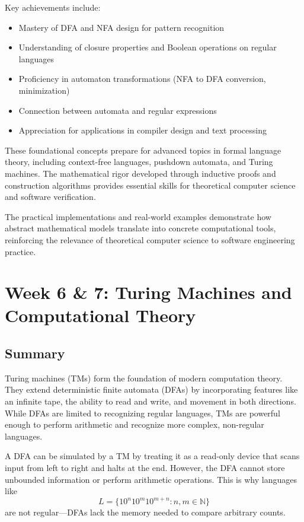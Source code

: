 \documentclass{article}
\begin{document}
Key achievements include:
\begin{itemize}
    \item Mastery of DFA and NFA design for pattern recognition
    \item Understanding of closure properties and Boolean operations on regular languages
    \item Proficiency in automaton transformations (NFA to DFA conversion, minimization)
    \item Connection between automata and regular expressions
    \item Appreciation for applications in compiler design and text processing
\end{itemize}

These foundational concepts prepare for advanced topics in formal language theory, including context-free languages, pushdown automata, and Turing machines. The mathematical rigor developed through inductive proofs and construction algorithms provides essential skills for theoretical computer science and software verification.

The practical implementations and real-world examples demonstrate how abstract mathematical models translate into concrete computational tools, reinforcing the relevance of theoretical computer science to software engineering practice.


\section{Week 6 \& 7: Turing Machines and Computational Theory}

\subsection{Summary}
Turing machines (TMs) form the foundation of modern computation theory. They extend deterministic finite automata (DFAs) by incorporating features like an infinite tape, the ability to read and write, and movement in both directions. While DFAs are limited to recognizing regular languages, TMs are powerful enough to perform arithmetic and recognize more complex, non-regular languages.

A DFA can be simulated by a TM by treating it as a read-only device that scans input from left to right and halts at the end. However, the DFA cannot store unbounded information or perform arithmetic operations. This is why languages like 
\[
L = \{10^n10^m10^{m+n} : n, m \in \mathbb{N}\}
\]
are not regular—DFAs lack the memory needed to compare arbitrary counts.
\end{document}
